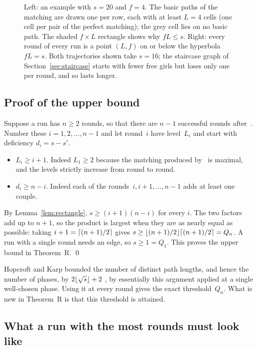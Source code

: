 \begin{figure}[ht]
\centering

\caption{Left: an example with $s=20$ and $f=4$. The basic paths of the
matching are drawn one per row, each with at least $L=4$ cells (one cell
per pair of the perfect matching); the grey cell lies on no basic path.
The shaded $f\times L$ rectangle shows why $fL\le s$. Right: every round
of every run is a point $(L,f)$ on or below the hyperbola $fL=s$. Both
trajectories shown take $s=16$; the staircase graph of
Section~\ref{sec:staircase} starts with fewer free girls but loses only
one per round, and so lasts longer.}
\label{fig:hyperbola}
\end{figure}

\subsection{Proof of the upper bound}

Suppose a run has $n\ge2$ rounds, so that there are $n-1$ successful
rounds after~. Number these $i=1,2,\ldots,n-1$ and let round~$i$
have level~$L_i$ and start with deficiency $d_i=s-s'$.

\begin{itemize}
\item $L_i\ge i+1$. Indeed $L_1\ge2$ because the matching produced by~ is
maximal, and the levels strictly increase from round to round.
\item $d_i\ge n-i$. Indeed each of the rounds~$i,i+1,\ldots,n-1$ adds at
least one couple.
\end{itemize}
By Lemma~\ref{lem:rectangle}, $s\ge(i+1)(n-i)$ for every $i$. The two
factors add up to $n+1$, so the product is largest when they are as
nearly equal as possible: taking $i+1=\lceil(n+1)/2\rceil$ gives
$s\ge\lfloor(n+1)/2\rfloor\lceil(n+1)/2\rceil=Q_n$. A run with a single round needs
an edge, so $s\ge1=Q_1$. This proves the upper bound in Theorem~R.
\qed

\medskip
Hopcroft and Karp bounded the number of distinct path lengths, and
hence the number of phases, by $2\lfloor\sqrt s\rfloor+2$ \cite[Theorem~3]{HK},
by essentially this argument applied at a single well-chosen phase.
Using it at every round gives the exact threshold~$Q_n$. What is new in
Theorem~R is that this threshold is attained.

\subsection{What a run with the most rounds must look like}
\label{sec:equality}

